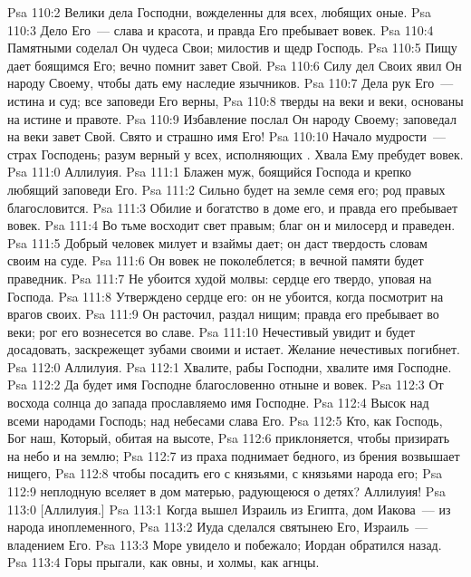 \vs Psa 110:2 Велики дела Господни, вожделенны для всех, любящих оные.
\vs Psa 110:3 Дело Его~--- слава и красота, и правда Его пребывает вовек.
\vs Psa 110:4 Памятными соделал Он чудеса Свои; милостив и щедр Господь.
\vs Psa 110:5 Пищу дает боящимся Его; вечно помнит завет Свой.
\vs Psa 110:6 Силу дел Своих явил Он народу Своему, чтобы дать ему наследие язычников.
\vs Psa 110:7 Дела рук Его~--- истина и суд; все заповеди Его верны,
\vs Psa 110:8 тверды на веки и веки, основаны на истине и правоте.
\vs Psa 110:9 Избавление послал Он народу Своему; заповедал на веки завет Свой. Свято и страшно имя Его!
\vs Psa 110:10 Начало мудрости~--- страх Господень; разум верный у всех, исполняющих . Хвала Ему пребудет вовек.
\vs Psa 111:0 Аллилуия.
\rsbpar\vs Psa 111:1 Блажен муж, боящийся Господа и крепко любящий заповеди Его.
\vs Psa 111:2 Сильно будет на земле семя его; род правых благословится.
\vs Psa 111:3 Обилие и богатство в доме его, и правда его пребывает вовек.
\vs Psa 111:4 Во тьме восходит свет правым; благ он и милосерд и праведен.
\vs Psa 111:5 Добрый человек милует и взаймы дает; он даст твердость словам своим на суде.
\vs Psa 111:6 Он вовек не поколеблется; в вечной памяти будет праведник.
\vs Psa 111:7 Не убоится худой молвы: сердце его твердо, уповая на Господа.
\vs Psa 111:8 Утверждено сердце его: он не убоится, когда посмотрит на врагов своих.
\vs Psa 111:9 Он расточил, раздал нищим; правда его пребывает во веки; рог его вознесется во славе.
\vs Psa 111:10 Нечестивый увидит  и будет досадовать, заскрежещет зубами своими и истает. Желание нечестивых погибнет.
\vs Psa 112:0 Аллилуия.
\rsbpar\vs Psa 112:1 Хвалите, рабы Господни, хвалите имя Господне.
\vs Psa 112:2 Да будет имя Господне благословенно отныне и вовек.
\vs Psa 112:3 От восхода солнца до запада  прославляемо имя Господне.
\vs Psa 112:4 Высок над всеми народами Господь; над небесами слава Его.
\vs Psa 112:5 Кто, как Господь, Бог наш, Который, обитая на высоте,
\vs Psa 112:6 приклоняется, чтобы призирать на небо и на землю;
\vs Psa 112:7 из праха поднимает бедного, из брения возвышает нищего,
\vs Psa 112:8 чтобы посадить его с князьями, с князьями народа его;
\vs Psa 112:9 неплодную вселяет в дом матерью, радующеюся о детях? Аллилуия!
\vs Psa 113:0 [Аллилуия.]
\rsbpar\vs Psa 113:1 Когда вышел Израиль из Египта, дом Иакова~--- из народа иноплеменного,
\vs Psa 113:2 Иуда сделался святынею Его, Израиль~--- владением Его.
\vs Psa 113:3 Море увидело и побежало; Иордан обратился назад.
\vs Psa 113:4 Горы прыгали, как овны, и холмы, как агнцы.
